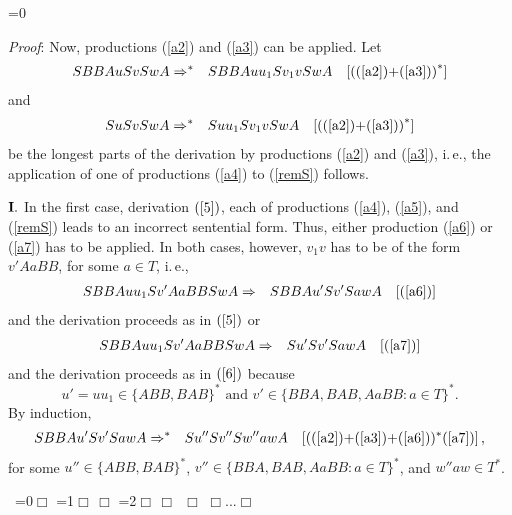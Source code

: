 \documentclass[copyright]{eptcs}
\makeatletter
\newcounter{d@proof}\let\thed@proof\relax\setcounter{d@proof}{0}
\newcommand*{\qed}{$\Box$}
\newenvironment{proof}{\ifnum \value{d@proof}=0{\setcounter{claim}{0}}\else\fi
  \stepcounter{d@proof}\par\noindent
  {\rmfamily\itshape\mdseries Proof\/}:\hspace{\labelsep}\ignorespaces}{\addtocounter{d@proof}{-1}\mbox{}\nolinebreak\hfill~\ifnum \value{d@proof}=0{\qed}\else
    \ifnum \value{d@proof}=1{\qed\nolinebreak\,\nolinebreak\qed}\else
      \ifnum \value{d@proof}=2{\qed\nolinebreak\,\nolinebreak\qed
          \nolinebreak\,\nolinebreak\qed}\else
        {\qed\nolinebreak...\nolinebreak\qed}\fi\fi\fi
  \medbreak
}
\newcommand{\Ra}{\Rightarrow}
\makeatother
\begin{document}
\begin{proof}
    Now, productions (\ref{a2}) and (\ref{a3}) can be applied. Let
    \begin{eqnarray}\label{5}
      SBBAuSvSwA & \Ra^* & SBBAuu_1Sv_1vSwA \quad [\textrm{((\ref{a2})+(\ref{a3}))}^*]
    \end{eqnarray}
    and
    \begin{eqnarray}\label{6}
      SuSvSwA & \Ra^* & Suu_1Sv_1vSwA \quad [\textrm{((\ref{a2})+(\ref{a3}))}^*]
    \end{eqnarray}
    be the longest parts of the derivation by productions (\ref{a2}) and (\ref{a3}), i.\,e., the application of one of productions (\ref{a4}) to (\ref{remS}) follows.

    ${\bf I.}$ In the first case, derivation $(\ref{5})$, each of productions (\ref{a4}), (\ref{a5}), and (\ref{remS}) leads to an incorrect sentential form. Thus, either production (\ref{a6}) or (\ref{a7}) has to be applied. In both cases, however, $v_1v$ has to be of the form $v'AaBB$, for some $a\in T$, i.\,e.,
    \begin{eqnarray}
      SBBAuu_1Sv'AaBBSwA & \Ra & SBBAu'Sv'SawA \quad [\textrm{(\ref{a6})}]
    \end{eqnarray}
    and the derivation proceeds as in $(\ref{5})$ or
    \begin{eqnarray}
      SBBAuu_1Sv'AaBBSwA & \Ra & Su'Sv'SawA \quad [\textrm{(\ref{a7})}]
    \end{eqnarray}
    and the derivation proceeds as in $(\ref{6})$ because 
    $$u'=uu_1\in\{ABB,BAB\}^* \mbox{ and }v'\in\{BBA,BAB,AaBB : a\in T\}^*.$$ 
    By induction,
    \begin{eqnarray}
      SBBAu'Sv'SawA & \Ra^* & Su''Sv''Sw''awA \quad [\textrm{((\ref{a2})+(\ref{a3})+(\ref{a6}))$^*$(\ref{a7})}]\,,
    \end{eqnarray}
    for some $u''\in\{ABB,BAB\}^*$, $v''\in\{BBA,BAB,AaBB : a\in T\}^*$, and
    $w''aw\in T^*$.


\end{proof}
\end{document}
